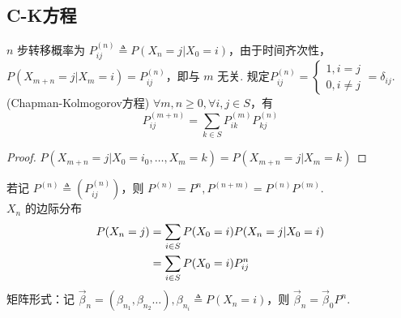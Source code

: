 \documentclass[./main.tex]{subfiles}
\begin{document}
\subsection{C-K方程}
$n$ 步转移概率为 $P_{ij}^{(n)}\triangleq P(X_n=j|X_0=i)$，由于时间齐次性，$P(X_{m+n}=j|X_m=i)=P_{ij}^{(n)}$，即与 $m$ 无关. 
规定$P_{ij}^{(n)}=\begin{cases}1,i=j\\0,i\neq j\end{cases}=\delta_{ij}$. \\
(Chapman-Kolmogorov方程) $\forall m,n\ge 0,\forall i,j\in S$，有
\begin{equation}
    P_{ij}^{(m+n)}=\sum_{k\in S}P_{ik}^{(m)}P_{kj}^{(n)}
\end{equation}
\begin{proof}
    $P(X_{m+n}=j|X_0=i_0,\dots,X_m=k)=P(X_{m+n}=j|X_m=k)$
\end{proof}
若记 $P^{(n)}\triangleq (P_{ij}^{(n)})$，则 $P^{(n)}=P^n,P^{(n+m)}=P^{(n)}P^{(m)}$. \\
$X_n$ 的边际分布
\begin{align}
    P(X_n=j)&=\sum_{i\in S}P(X_0=i)P(X_n=j|X_0=i)\notag\\
    &=\sum_{i\in S}P(X_0=i)P_{ij}^{n}
\end{align}
矩阵形式：记 $\vec{\beta}_n=(\beta_{n_1},\beta_{n_2}\dots),\beta_{n_{i}}\triangleq P(X_n=i)$，则 $\vec{\beta}_n=\vec{\beta}_0P^n$. 
\end{document}
